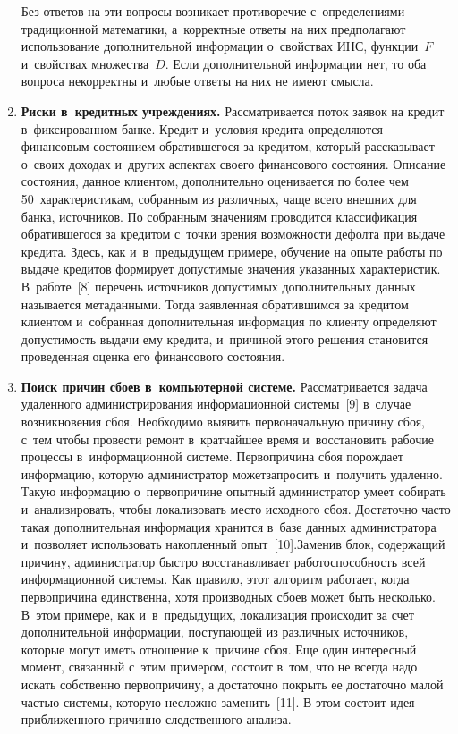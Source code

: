 \begin{multicols}{2}
\begin{enumerate}[1.]
  Без ответов на эти вопросы возникает противоречие с~определениями 
традиционной математики, а~корректные ответы на них предполагают 
использование дополнительной \mbox{информации} о~свойствах ИНС, функции~$F$ 
и~свойствах множества~$D$. Если дополнительной информации нет, то оба 
вопроса некорректны и~любые ответы на них не имеют смысла.
  
  \item \textbf{Риски в~кредитных учреждениях.} Рассматривается поток заявок на 
кредит в~фиксированном банке. Кредит и~условия кредита определяются 
финансовым состоянием обратившегося за кредитом, который рассказывает 
о~своих доходах и~других аспектах своего финансового состояния. Описание 
состояния, данное клиентом, дополнительно оценивается по более чем 
50~характеристикам, собранным из различных, чаще всего внешних для банка, 
источников. По собранным значениям проводится классификация обратившегося 
за кредитом с~точки зрения возможности дефолта при выдаче кредита. Здесь, как 
и~в~предыдущем примере, обучение на опыте работы по выдаче кредитов 
формирует допустимые значения указанных характеристик. В~работе~[8] 
перечень источников допустимых дополнительных данных называется 
метаданными. Тогда заявленная обратившимся за кредитом клиентом и~собранная 
дополнительная информация по клиенту определяют допустимость выдачи ему 
кредита, и~причиной этого решения становится проведенная оценка его 
финансового состояния.
  
  \item \textbf{Поиск причин сбоев в~компьютерной системе.} Рассматривается 
задача удаленного администрирования информационной системы~[9] в~случае 
возникновения сбоя. Необходимо выявить первоначальную причину сбоя, с~тем 
чтобы провести ремонт в~кратчайшее время и~восстановить рабочие процессы 
в~информационной системе. Первопричина сбоя порождает информацию, 
которую администратор может\linebreak запросить и~получить удаленно. Такую 
информацию о~первопричине опытный администратор умеет собирать 
и~анализировать, чтобы локализовать место исходного сбоя. \mbox{Достаточно} часто такая 
дополнительная информация хранится в~базе данных администратора и~позволяет 
использовать накопленный опыт~[10].\linebreak Заменив блок, содержащий причину, 
администратор быст\-ро восстанавливает работоспособность всей информационной 
системы. Как правило, этот алгоритм работает, когда первопричина единственна, 
хотя производных сбоев может быть несколько. В~этом примере, как 
и~в~предыдущих, локализация происходит за счет дополнительной информации, 
по\-сту\-па\-ющей из различных источников, которые могут иметь отношение 
к~причине сбоя. Еще один интересный момент, связанный с~этим примером, 
состоит в~том, что не всегда надо искать собственно первопричину, а достаточно 
покрыть ее достаточно малой частью системы, которую несложно заменить~[11]. 
В этом состоит идея приближенного причинно-следственного анализа.
  

\end{enumerate}
\end{multicols}
